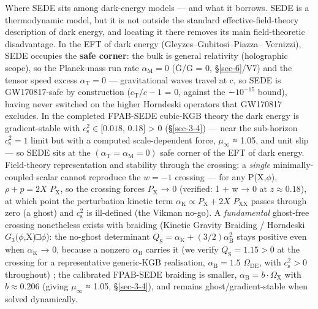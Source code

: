 \documentclass[preprint,12pt]{elsarticle}
\begin{document}
Where SEDE sits among dark-energy models --- and what it borrows. SEDE
is a thermodynamic model, but it is not outside the standard
effective-field-theory description of dark energy, and locating it there
removes its main field-theoretic disadvantage. In the EFT of dark energy
(Gleyzes--Gubitosi--Piazza-- Vernizzi), SEDE occupies the \textbf{safe
corner}: the bulk is general relativity (holographic scope), so the
Planck-mass run rate \(\alpha _{\mathrm{M}} = 0\) (Ġ/G = 0,
§\ref{sec-6}/V7) and the tensor speed excess
\(\alpha _{\mathrm{T}} = 0\) --- gravitational waves travel at c, so
SEDE is GW170817-safe by construction
(\textbar{}\(c_{\mathrm{T}}/c - 1\)\textbar{} = 0, against the
∼\(10^{-15}\) bound), having never switched on the higher Horndeski
operators that GW170817 excludes. In the completed FPAB-SEDE cubic-KGB
theory the dark energy is gradient-stable with
\(c_{\mathrm{s}}^{2} \in  [0.018\), 0.18{]} \textgreater{} 0
(§\ref{sec-3-4}) --- near the sub-horizon \(c_{\mathrm{s}}^{2} = 1\)
limit but with a computed scale-dependent force, \(\mu_\infty\) ≈ 1.05,
and unit slip --- so SEDE sits at the
\((\alpha _{\mathrm{T}} = \alpha _{\mathrm{M}} = 0)\) safe corner of the
EFT of dark energy. Field-theory representation and stability through
the crossing: a \emph{single} minimally-coupled scalar cannot reproduce
the \(w = -1\) crossing --- for any P(X,\(\phi\)), \(\rho  + p = 2X\)
\(P_{\mathrm{X}}\), so the crossing forces \(P_{\mathrm{X}}\) → 0
(verified: 1 + w → 0 at \(z \approx  0.18\)), at which point the
perturbation kinetic term
\(\alpha _{\mathrm{K}} \propto  P_{\mathrm{X}} + 2X\) \(P_\mathrm{XX}\)
passes through zero (a ghost) and \(c_{\mathrm{s}}^{2}\) is ill-defined
(the Vikman no-go). A \emph{fundamental} ghost-free crossing nonetheless
exists with braiding (Kinetic Gravity Braiding / Horndeski
\(G_{3}(\phi\),X)□\(\phi\)): the no-ghost determinant
\(Q_{\mathrm{S}} = \alpha _{\mathrm{K}} + (3/2)\alpha _{\mathrm{B}}^{2}\)
stays positive even when \(\alpha _{\mathrm{K}}\) → 0, because a nonzero
\(\alpha _{\mathrm{B}}\) carries it (we verify
\(Q_{\mathrm{S}} = 1.15 > 0\) at the crossing for a representative
generic-KGB realisation, \(\alpha _{\mathrm{B}} = 1.5\)
\(\Omega _\mathrm{DE}\), with \(c_{\mathrm{s}}^{2} > 0\) throughout)
\citep{Deffayet:2010qz, Kimura:2010di}; the calibrated FPAB-SEDE
braiding is smaller,
\(\alpha _{\mathrm{B}} = b\cdot \Omega _{\mathrm{X}}\) with
\(b \approx  0.206\) (giving \(\mu_\infty\) ≈ 1.05, §\ref{sec-3-4}), and
remains ghost/gradient-stable when solved dynamically.
\end{document}
